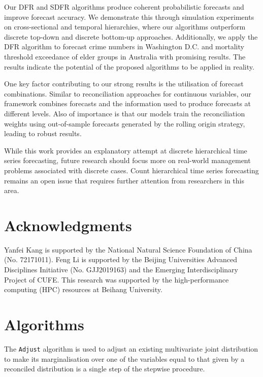 \documentclass[a4paper,review,12pt,authoryear]{elsarticle}
\let\code=\texttt
\begin{document}
     Our DFR and SDFR algorithms produce coherent probabilistic forecasts and improve forecast accuracy.
     We demonstrate this through simulation experiments on cross-sectional and temporal hierarchies, where our algorithms outperform discrete top-down and discrete bottom-up approaches. Additionally, we apply the DFR algorithm to forecast crime numbers in Washington D.C. and mortality threshold exceedance of elder groups in Australia with promising results.
     The results indicate the potential of the proposed algorithms to be applied in reality.

     One key factor contributing to our strong results is the utilisation of forecast combinations.
     Similar to reconciliation approaches for continuous variables, our framework combines forecasts and the information used to produce forecasts at different levels.
     Also of importance is that our models train the reconciliation weights using out-of-sample forecasts generated by the rolling origin strategy, leading to robust results.


     While this work provides an explanatory attempt at discrete hierarchical time series forecasting, future research should focus more on real-world management problems associated with discrete cases. Count hierarchical time series forecasting remains an open issue that requires further attention from researchers in this area.

\section*{Acknowledgments}

Yanfei Kang is supported by the National Natural Science Foundation of China (No. 72171011). Feng Li is supported by the Beijing Universities Advanced Disciplines Initiative (No. GJJ2019163) and the Emerging Interdisciplinary Project of CUFE. This research was supported by the high-performance computing (HPC) resources at Beihang University.

\newpage





\newpage

\appendix

\section{Algorithms}
\label{appendix:adjust}

The \code{Adjust} algorithm is used to adjust an existing multivariate joint distribution to make its marginalisation over one of the variables equal to that given by a reconciled distribution is a single step of the stepwise procedure.
\end{document}
